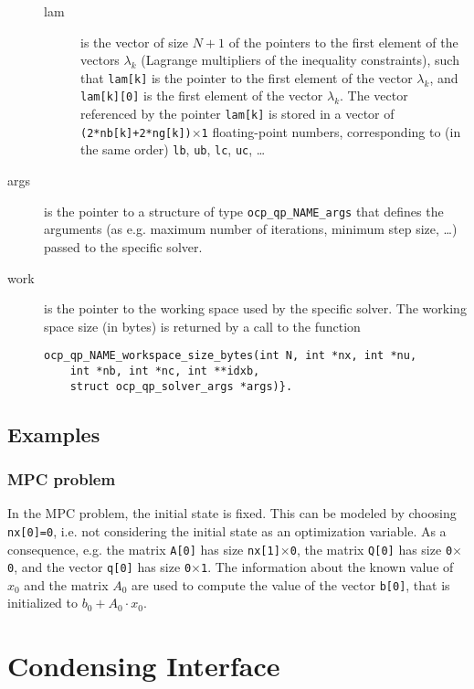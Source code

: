 \documentclass{report}
\begin{document}
\begin{description}
\begin{description}
		\item[lam] is the vector of size $N+1$ of the pointers to the first element of the vectors $\lambda_k$ (Lagrange multipliers of the inequality constraints), such that \texttt{lam[k]} is the pointer to the first element of the vector $\lambda_k$, and \texttt{lam[k][0]} is the first element of the vector $\lambda_k$.
		The vector referenced by the pointer \texttt{lam[k]} is stored in a vector of \texttt{(2*nb[k]+2*ng[k])$\times$1} floating-point numbers, corresponding to (in the same order) \texttt{lb}, \texttt{ub}, \texttt{lc}, \texttt{uc}, \ldots
	\end{description}
	\item[args] is the pointer to a structure of type \texttt{ocp\_qp\_NAME\_args} that defines the arguments (as e.g. maximum number of iterations, minimum step size, \ldots) passed to the specific solver.
	\item[work] is the pointer to the working space used by the specific solver.
The working space size (in bytes) is returned by a call to the function 
\begin{verbatim}
ocp_qp_NAME_workspace_size_bytes(int N, int *nx, int *nu, 
    int *nb, int *nc, int **idxb, 
    struct ocp_qp_solver_args *args)}. 
\end{verbatim}
\end{description}

\subsection{Examples}

\subsubsection{MPC problem}

In the MPC problem, the initial state is fixed.
This can be modeled by choosing \texttt{nx[0]=0}, i.e. not considering the initial state as an optimization variable.
As a consequence, e.g. the matrix \texttt{A[0]} has size \texttt{nx[1]$\times$0}, the matrix \texttt{Q[0]} has size \texttt{0$\times$0}, and the vector \texttt{q[0]} has size \texttt{0$\times$1}.
The information about the known value of $x_0$ and the matrix $A_0$ are used to compute the value of the vector \texttt{b[0]}, that is initialized to $b_0 + A_0 \cdot x_0$.

\section{Condensing Interface}
\end{document}
